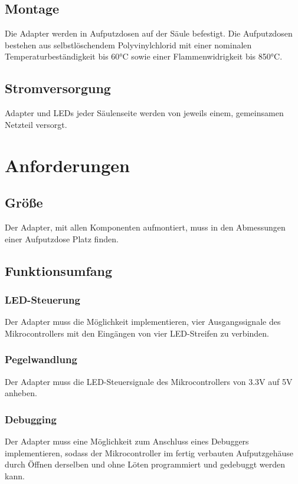 \documentclass[a4paper,11pt]{article}
\begin{document}
\subsection{Montage}
Die Adapter werden in Aufputzdosen
auf der S\"aule befestigt.
Die Aufputzdosen bestehen aus selbstl\"oschendem Polyvinylchlorid
mit einer nominalen Temperaturbest\"andigkeit bis 60\si{\degree}C
sowie einer Flammenwidrigkeit bis 850\si{\degree}C.

\subsection{Stromversorgung}
Adapter und LEDs jeder S\"aulenseite
werden von jeweils einem, gemeinsamen
Netzteil versorgt.

\newpage
\section{Anforderungen}

\subsection{Gr\"o{\ss}e}
Der Adapter, mit allen Komponenten aufmontiert,
muss in den Abmessungen einer Aufputzdose Platz finden.

\subsection{Funktionsumfang}
\subsubsection{LED-Steuerung}
Der Adapter muss die M\"oglichkeit implementieren,
vier Ausgangssignale des Mikrocontrollers
mit den Eing\"angen von vier LED-Streifen zu verbinden.

\subsubsection{Pegelwandlung}
Der Adapter muss die LED-Steuersignale des Mikrocontrollers
von 3.3V auf 5V anheben.

\subsubsection{Debugging}
Der Adapter muss eine M\"oglichkeit zum Anschluss
eines Debuggers implementieren,
sodass der Mikrocontroller
im fertig verbauten Aufputzgeh\"ause
durch \"Offnen derselben und ohne L\"oten
programmiert und gedebuggt werden kann.
\end{document}
